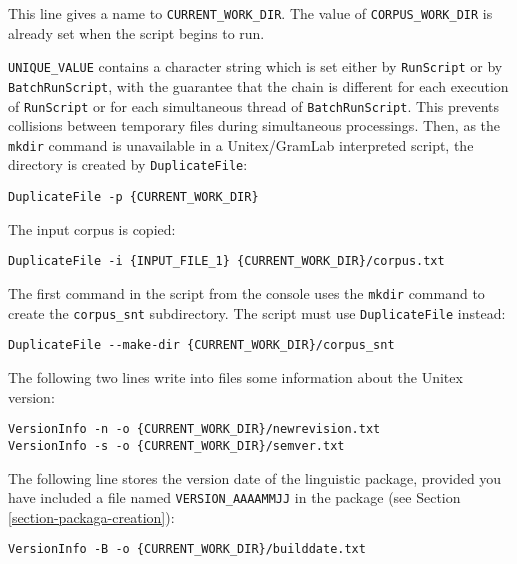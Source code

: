 \noindent This line gives a name to \verb$CURRENT_WORK_DIR$. The value of
\verb$CORPUS_WORK_DIR$ is already set when the script begins to run.

\verb$UNIQUE_VALUE$ contains a character string which is set either by \verb$RunScript$ or by
\verb$BatchRunScript$, with the guarantee that the chain is different for each execution of
\verb$RunScript$ or for each simultaneous thread of \verb$BatchRunScript$. This
prevents collisions between temporary files during simultaneous processings. Then,
as the \verb$mkdir$ command is unavailable in a Unitex/GramLab interpreted script, the
directory is created by \verb$DuplicateFile$:

\begin{Verbatim}[fontsize=\small,fontfamily=helvetica]
DuplicateFile -p {CURRENT_WORK_DIR}
\end{Verbatim}

\noindent The input corpus is copied:

\begin{Verbatim}[fontsize=\small,fontfamily=helvetica]
DuplicateFile -i {INPUT_FILE_1} {CURRENT_WORK_DIR}/corpus.txt
\end{Verbatim}

\noindent The first command in the script from the console uses the
\verb$mkdir$ command to create the \verb$corpus_snt$ subdirectory. The script must use
\verb$DuplicateFile$ instead:

\begin{Verbatim}[fontsize=\small,fontfamily=helvetica]
DuplicateFile --make-dir {CURRENT_WORK_DIR}/corpus_snt
\end{Verbatim}

\noindent The following two lines write into files some information about the Unitex version:

\begin{Verbatim}[fontsize=\small,fontfamily=helvetica]
VersionInfo -n -o {CURRENT_WORK_DIR}/newrevision.txt
VersionInfo -s -o {CURRENT_WORK_DIR}/semver.txt
\end{Verbatim}

\noindent The following line stores the version date of the linguistic package,
provided you have included a file named \verb$VERSION_AAAAMMJJ$ in the package
(see Section \ref{section-packaga-creation}):

\begin{Verbatim}[fontsize=\small,fontfamily=helvetica]
VersionInfo -B -o {CURRENT_WORK_DIR}/builddate.txt
\end{Verbatim}

